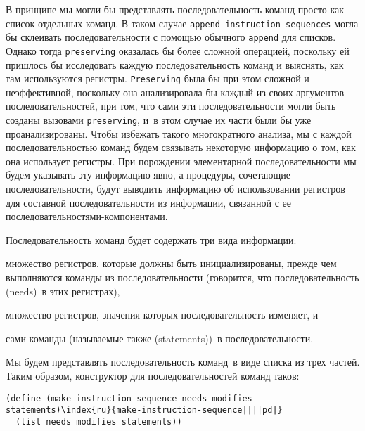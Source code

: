 В принципе мы могли бы представлять последовательность
команд просто как список отдельных команд.  В таком случае
{\tt append-instruction-se\-quen\-ces} могла бы склеивать
последовательности с помощью обычного {\tt append} для
списков.  Однако тогда {\tt preserving} оказалась бы более
сложной операцией, поскольку ей пришлось бы исследовать каждую
последовательность команд и выяснять, как там используются регистры.
{\tt Preserving} была бы при этом сложной и неэффективной,
поскольку она анализировала бы каждый из своих
аргументов-последовательностей, при том, что сами эти
последовательности могли быть созданы вызовами
{\tt preserving}, и~в этом случае их части были бы уже
проанализированы.  Чтобы избежать такого многократного анализа, мы с
каждой последовательностью команд будем связывать некоторую информацию
о том, как она использует регистры.  При порождении элементарной
последовательности мы будем указывать эту информацию явно, а
процедуры, сочетающие последовательности, будут выводить информацию об
использовании регистров для составной последовательности из
информации, связанной с ее последовательностями-компонентами.

Последовательность команд будет содержать три вида
информации:

\begin{plainlist}


\item
множество регистров, которые должны быть
инициализированы, прежде чем выполняются команды из последовательности
(говорится, что последовательность 
 (needs)~в этих регистрах),

\item
множество регистров, значения которых
последовательность изменяет, и

\item
сами команды (называемые также 
 (statements))~в последовательности.
\end{plainlist}
Мы будем представлять последовательность команд~в виде списка из трех
частей.  Таким образом, конструктор для последовательностей команд
таков:

\begin{Verbatim}[fontsize=\small]
(define (make-instruction-sequence needs modifies statements)\index{ru}{make-instruction-sequence||||pd|}
  (list needs modifies statements))
\end{Verbatim}

